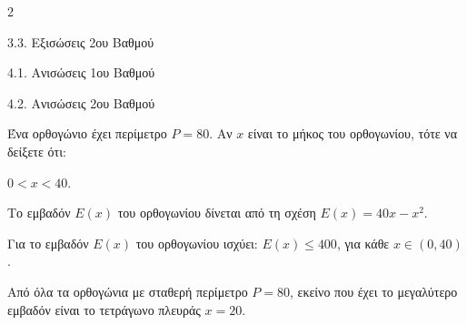 \begin{ylh}{2}
    \item 3.3. Εξισώσεις 2ου Βαθμού
    \item 4.1. Ανισώσεις 1ου Βαθμού
    \item 4.2. Ανισώσεις 2ου Βαθμού
\end{ylh}
Ένα ορθογώνιο έχει περίμετρο $P = 80$. Αν $x$ είναι το μήκος του ορθογωνίου, τότε να δείξετε ότι:

\begin{alist}
\item $0 < x < 40$.
\item Το εμβαδόν $E(x)$ του ορθογωνίου δίνεται από τη σχέση $E(x) = 40x - x^2$.
\item Για το εμβαδόν $E(x)$ του ορθογωνίου ισχύει: $E(x) \le 400$, για κάθε $x \in (0, 40)$.
\item Από όλα τα ορθογώνια με σταθερή περίμετρο $P = 80$, εκείνο που έχει το μεγαλύτερο εμβαδόν είναι το τετράγωνο πλευράς $x = 20$.
\end{alist}

